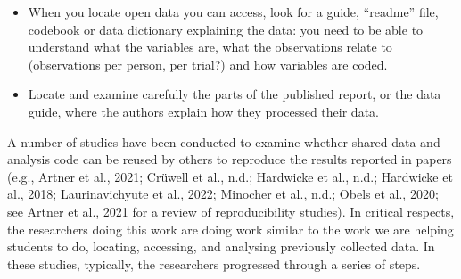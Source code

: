 \documentclass[
  letterpaper,
  DIV=11,
  numbers=noendperiod]{scrreprt}
\providecommand{\tightlist}{%
  \setlength{\itemsep}{0pt}\setlength{\parskip}{0pt}}\usepackage{longtable,booktabs,array}
\begin{document}
\begin{tcolorbox}[enhanced jigsaw, opacitybacktitle=0.6, title=\textcolor{quarto-callout-tip-color}{\faLightbulb}\hspace{0.5em}{Tip}, arc=.35mm, colbacktitle=quarto-callout-tip-color!10!white, colframe=quarto-callout-tip-color-frame, leftrule=.75mm, opacityback=0, breakable, titlerule=0mm, left=2mm, bottomrule=.15mm, toprule=.15mm, colback=white, coltitle=black, bottomtitle=1mm, toptitle=1mm, rightrule=.15mm]

\begin{itemize}
\tightlist
\item
  When you locate open data you can access, look for a guide, ``readme''
  file, codebook or data dictionary explaining the data: you need to be
  able to understand what the variables are, what the observations
  relate to (observations per person, per trial?) and how variables are
  coded.
\item
  Locate and examine carefully the parts of the published report, or the
  data guide, where the authors explain how they processed their data.
\end{itemize}

\end{tcolorbox}

A number of studies have been conducted to examine whether shared data
and analysis code can be reused by others to reproduce the results
reported in papers (e.g., Artner et al., 2021; Crüwell et al., n.d.;
Hardwicke et al., n.d.; Hardwicke et al., 2018; Laurinavichyute et al.,
2022; Minocher et al., n.d.; Obels et al., 2020; see Artner et al., 2021
for a review of reproducibility studies). In critical respects, the
researchers doing this work are doing work similar to the work we are
helping students to do, locating, accessing, and analysing previously
collected data. In these studies, typically, the researchers progressed
through a series of steps.
\end{document}
